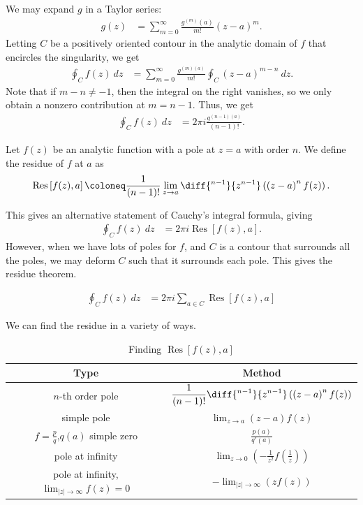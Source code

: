 \documentclass[10pt]{mypackage}
\DeclareMathOperator{\Res}{Res}
\begin{document}
We may expand $g$ in a Taylor series:
\begin{align*}
  g(z) &= \sum_{m=0}^{\infty}\frac{g^{(m)}(a)}{m!}\left( z-a \right)^m.
\end{align*}
Letting $C$ be a positively oriented contour in the analytic domain of $f$ that encircles the singularity, we get
\begin{align*}
  \oint_{C}f(z)\:dz &= \sum_{m=0}^{\infty}\frac{g^{(m)(a)}}{m!} \oint_{C}\left( z-a \right)^{m-n}\:dz.
\end{align*}
Note that if $m-n\neq -1$, then the integral on the right vanishes, so we only obtain a nonzero contribution at $m = n-1$. Thus, we get
\begin{align*}
  \oint_{C}f(z)\:dz &= 2\pi i \frac{g^{(n-1)(a)}}{(n-1)!}.
\end{align*}
\begin{definition}
  Let $f(z)$ be an analytic function with a pole at $z=a$ with order $n$. We define the residue of $f$ at $a$ as
  \begin{align*}
    \Res\left[ f(z),a \right] \coloneq \frac{1}{\left( n-1 \right)!}\lim_{z\rightarrow a}\diff{^{n-1}}{z^{n-1}} \left( \left( z-a \right)^nf(z) \right).
  \end{align*}
\end{definition}
This gives an alternative statement of Cauchy's integral formula, giving
\begin{align*}
  \oint_{C}f(z)\:dz &= 2\pi i \Res\left[ f(z),a \right].
\end{align*}
However, when we have lots of poles for $f$, and $C$ is a contour that surrounds all the poles, we may deform $C$ such that it surrounds each pole. This gives the residue theorem.
\begin{theorem}
  \begin{align*}
    \oint_{C}f(z)\:dz &= 2\pi i \sum_{a\in C}\Res\left[ f(z),a \right] \label{thm:residue_theorem}\tag{\textdagger\textdagger}
  \end{align*}
\end{theorem}
We can find the residue in a variety of ways.
\begin{table}[h!]
  \centering
  \renewcommand{\arraystretch}{1.75}
  \begin{tabular}{c|c}
    Type & Method \\
    \hline\hline
    $n$-th order pole & $\displaystyle\frac{1}{\left( n-1 \right)!}\diff{^{n-1}}{z^{n-1}}\left( \left( z-a \right)^nf(z) \right)$\\
    simple pole & $\displaystyle\lim_{z\rightarrow a}\left( z-a \right)f(z)$\\
    $f = \frac{p}{q}$,$q(a)$ simple zero & $\displaystyle \frac{p(a)}{q'(a)}$\\
    pole at infinity & $\displaystyle\lim_{z\rightarrow 0} \left( -\frac{1}{z^2}f\left( \frac{1}{z} \right) \right)$\\
    pole at infinity, $\lim_{|z|\rightarrow\infty}f(z) =0$& $\displaystyle -\lim_{|z|\rightarrow\infty}\left( zf(z) \right)$
  \end{tabular}
  \caption{Finding $\Res\left[ f(z),a \right]$}
\end{table}
\end{document}
